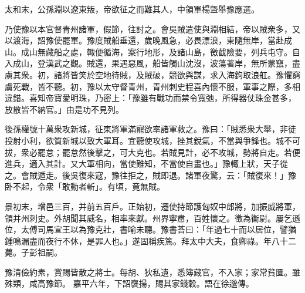 \begin{pinyinscope}
 
 太和末，公孫淵以遼東叛，帝欲征之而難其人，中領軍楊曁舉豫應選。
 
 
 乃使豫以本官督青州諸軍，假節，往討之。會吳賊遣使與淵相結，帝以賊衆多，又以渡海，詔豫使罷軍。豫度賊船垂還，歲晚風急，必畏漂浪，東隨無岸，當赴成山。成山無藏船之處，輙便循海，案行地形，及諸山島，徼截險要，列兵屯守。自入成山，登漢武之觀。賊還，果遇惡風，船皆觸山沈沒，波蕩著岸，無所蒙竄，盡虜其衆。初，諸將皆笑於空地待賊，及賊破，競欲與謀，求入海鉤取浪舡。豫懼窮虜死戰，皆不聽。初，豫以太守督青州，青州刺史程喜內懷不服，軍事之際，多相違錯。喜知帝寶愛明珠，乃密上：「豫雖有戰功而禁令寬弛，所得器仗珠金甚多，放散皆不納官。」由是功不見列。
 
 
 
 
 後孫權號十萬衆攻新城，征東將軍滿寵欲率諸軍救之。豫曰：「賊悉衆大舉，非徒投射小利，欲質新城以致大軍耳。宜聽使攻城，挫其銳氣，不當與爭鋒也。城不可拔，衆必罷怠；罷怠然後擊之，可大克也。若賊見計，必不攻城，勢將自走。若便進兵，適入其計。又大軍相向，當使難知，不當使自畫也。」豫輙上狀，天子從之。會賊遁走。後吳復來寇，豫往拒之，賊即退。諸軍夜驚，云：「賊復來！」豫卧不起，令衆「敢動者斬」。有頃，竟無賊。
 
 
景初末，增邑三百，并前五百戶。正始初，遷使持節護匈奴中郎將，加振威將軍，領并州刺史。外胡聞其威名，相率來獻。州界寧肅，百姓懷之。徵為衞尉。屢乞遜位，太傅司馬宣王以為豫克壯，書喻未聽。豫書荅曰：「年過七十而以居位，譬猶鍾鳴漏盡而夜行不休，是罪人也。」遂固稱疾篤。拜太中大夫，食卿祿。年八十二薨。子彭祖嗣。
 
 
豫清儉約素，賞賜皆散之將士。每胡、狄私遺，悉簿藏官，不入家；家常貧匱。雖殊類，咸高豫節。
 嘉平六年，下詔襃揚，賜其家錢糓。語在徐邈傳。
 
 
\end{pinyinscope}